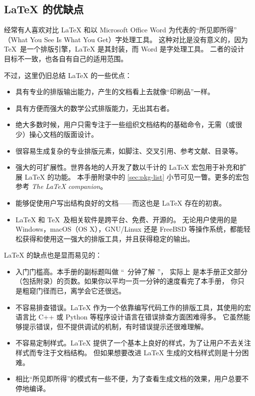 \subsection{\LaTeX{} 的优缺点}\label{subec:advs}

经常有人喜欢对比 \LaTeX{} 和以 Microsoft Office Word 为代表的“所见即所得”%
（What You See Is What You Get）字处理工具。
这种对比是没有意义的，因为 \TeX\ 是一个排版引擎，\LaTeX{} 是其封装，而 Word 是字处理工具。
二者的设计目标不一致，也各自有自己的适用范围。

不过，这里仍旧总结 \LaTeX{} 的一些优点：
\begin{itemize}
  \item 具有专业的排版输出能力，产生的文档看上去就像“印刷品”一样。
  \item 具有方便而强大的数学公式排版能力，无出其右者。
  \item 绝大多数时候，用户只需专注于一些组织文档结构的基础命令，无需（或很少）操心文档的版面设计。
  \item 很容易生成复杂的专业排版元素，如脚注、交叉引用、参考文献、目录等。
  \item 强大的可扩展性。世界各地的人开发了数以千计的 \LaTeX{} 宏包用于补充和扩展 \LaTeX{} 的功能。
  本手册附录中的 \ref{sec:pkg-list} 小节可见一瞥。更多的宏包参考 \textit{The \LaTeX{} companion}\cite{companion}。
  \item 能够促使用户写出结构良好的文档——而这也是 \LaTeX{} 存在的初衷。
  \item \LaTeX{} 和 \TeX\ 及相关软件是跨平台、免费、开源的。
  无论用户使用的是 Windows，macOS（OS X），GNU/Linux 还是 FreeBSD 等操作系统，都能轻松获得和使用这一强大的排版工具，并且获得稳定的输出。
\end{itemize}

\LaTeX{} 的缺点也是显而易见的：
\begin{itemize}
  \item 入门门槛高。本手册的副标题叫做 “\pageref{lshort-minutes}~分钟了解 \LaTeXe ”，
  实际上 \pageref{lshort-minutes} 是本手册正文部分（包括附录）的页数。如果你以平均一页一分钟的速度看完了本手册，
  你只是粗窥门径而已，离学会它还很远。
  \item 不容易排查错误。\LaTeX{} 作为一个依靠编写代码工作的排版工具，其使用的宏语言比 C++ 或 Python 等程序设计语言在错误排查方面困难得多。
  它虽然能够提示错误，但不提供调试的机制，有时错误提示还很难理解。
  \item 不容易定制样式。\LaTeX{} 提供了一个基本上良好的样式，为了让用户不去关注样式而专注于文档结构。
  但如果想要改进 \LaTeX{} 生成的文档样式则是十分困难。
  \item 相比“所见即所得”的模式有一些不便，为了查看生成文档的效果，用户总要不停地编译。
\end{itemize}

